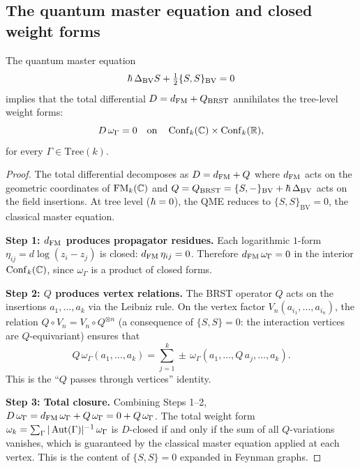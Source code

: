\subsection{The quantum master equation and closed weight forms}

\begin{proposition}
\label{prop:thqg-bv-ext-qme-closedness}
The quantum master equation
\begin{equation}
\hbar\,\Delta_{\mathrm{BV}} S
+ \tfrac{1}{2}\{S, S\}_{\mathrm{BV}} = 0
\end{equation}
implies that the total differential $D = d_{\operatorname{FM}} + Q_{\mathrm{BRST}}$
annihilates the tree-level weight forms:
\[
D\,\omega_\Gamma = 0
\quad\text{on}\quad
\operatorname{Conf}_k(\mathbb{C}) \times \operatorname{Conf}_k(\mathbb{R}),
\]
for every $\Gamma \in \mathrm{Tree}(k)$.
\end{proposition}

\begin{proof}
The total differential decomposes as $D = d_{\operatorname{FM}} + Q$ where
$d_{\operatorname{FM}}$ acts on the geometric coordinates of $\operatorname{FM}_k(\mathbb{C})$ and
$Q = Q_{\mathrm{BRST}} = \{S, -\}_{\mathrm{BV}} + \hbar\,\Delta_{\mathrm{BV}}$
acts on the field insertions. At tree level ($\hbar = 0$), the QME
reduces to $\{S, S\}_{\mathrm{BV}} = 0$, the classical master
equation.

\medskip\noindent\textbf{Step 1: $d_{\operatorname{FM}}$ produces propagator
residues.}
Each logarithmic $1$-form $\eta_{ij} = d\log(z_i - z_j)$ is
closed: $d_{\operatorname{FM}}\,\eta_{ij} = 0$. Therefore
$d_{\operatorname{FM}}\,\omega_\Gamma = 0$ in the interior $\operatorname{Conf}_k(\mathbb{C})$, since
$\omega_\Gamma$ is a product of closed forms.

\medskip\noindent\textbf{Step 2: $Q$ produces vertex relations.}
The BRST operator $Q$ acts on the insertions $a_1, \ldots, a_k$
via the Leibniz rule. On the vertex factor $V_n(a_{i_1}, \ldots,
a_{i_n})$, the relation $Q \circ V_n = V_n \circ Q^{\otimes n}$
(a consequence of $\{S, S\} = 0$: the interaction vertices are
$Q$-equivariant) ensures that
\[
Q\,\omega_\Gamma(a_1, \ldots, a_k)
= \sum_{j=1}^{k} \pm\,
\omega_\Gamma(a_1, \ldots, Q\,a_j, \ldots, a_k).
\]
This is the ``$Q$ passes through vertices'' identity.

\medskip\noindent\textbf{Step 3: Total closure.}
Combining Steps 1--2, $D\,\omega_\Gamma = d_{\operatorname{FM}}\,\omega_\Gamma
+ Q\,\omega_\Gamma = 0 + Q\,\omega_\Gamma$. The total weight form
$\omega_k = \sum_\Gamma |\operatorname{Aut}(\Gamma)|^{-1}\,\omega_\Gamma$ is
$D$-closed if and only if the sum of all $Q$-variations vanishes,
which is guaranteed by the classical master equation applied at each
vertex. This is the content of $\{S, S\} = 0$ expanded in Feynman
graphs.
\end{proof}

